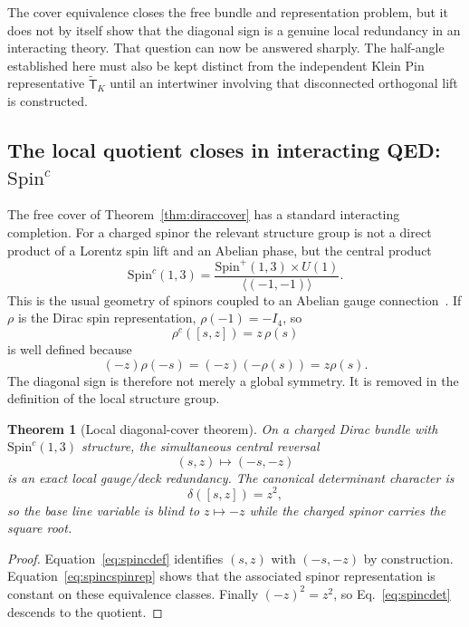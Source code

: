 \documentclass[11pt]{article}
\newtheorem{theorem}{Theorem}[section]
\theoremstyle{definition}\newtheorem{definition}[theorem]{Definition}
\theoremstyle{remark}\newtheorem{remark}[theorem]{Remark}\newtheorem{conjecture}[theorem]{Conjecture}
\begin{document}
The cover equivalence closes the free bundle and representation problem, but it does not by itself show that the diagonal sign is a genuine local redundancy in an interacting theory. That question can now be answered sharply. The half-angle established here must also be kept distinct from the independent Klein Pin representative $\widetilde{\mathsf T}_K$ until an intertwiner involving that disconnected orthogonal lift is constructed.

\subsection{The local quotient closes in interacting QED: \texorpdfstring{$\mathrm{Spin}^c$}{Spin-c}}
The free cover of Theorem~\ref{thm:diraccover} has a standard interacting completion. For a charged spinor the relevant structure group is not a direct product of a Lorentz spin lift and an Abelian phase, but the central product
\begin{equation}\label{eq:spincdef}
 \boxed{
 \mathrm{Spin}^c(1,3)
 =\frac{\mathrm{Spin}^+(1,3)\times U(1)}
 {\langle(-1,-1)\rangle}.}
\end{equation}
This is the usual geometry of spinors coupled to an Abelian gauge connection~\cite{LawsonMichelsohn1989,Janssens2018}. If $\rho$ is the Dirac spin representation, $\rho(-1)=-I_4$, so
\begin{equation}\label{eq:spincspinrep}
 \rho^c([s,z])=z\,\rho(s)
\end{equation}
is well defined because
\begin{equation}
 (-z)\rho(-s)=(-z)(-\rho(s))=z\rho(s).
\end{equation}
The diagonal sign is therefore not merely a global symmetry. It is removed in the definition of the local structure group.

\begin{theorem}[Local diagonal-cover theorem]\label{thm:spincquotient}
On a charged Dirac bundle with $\mathrm{Spin}^c(1,3)$ structure, the simultaneous central reversal
\begin{equation}
 (s,z)\longmapsto(-s,-z)
\end{equation}
is an exact local gauge/deck redundancy. The canonical determinant character is
\begin{equation}\label{eq:spincdet}
 \boxed{\delta([s,z])=z^2,}
\end{equation}
so the base line variable is blind to $z\mapsto-z$ while the charged spinor carries the square root.
\end{theorem}
\begin{proof}
Equation~\eqref{eq:spincdef} identifies $(s,z)$ with $(-s,-z)$ by construction. Equation~\eqref{eq:spincspinrep} shows that the associated spinor representation is constant on these equivalence classes. Finally $(-z)^2=z^2$, so Eq.~\eqref{eq:spincdet} descends to the quotient.
\end{proof}
\end{document}
